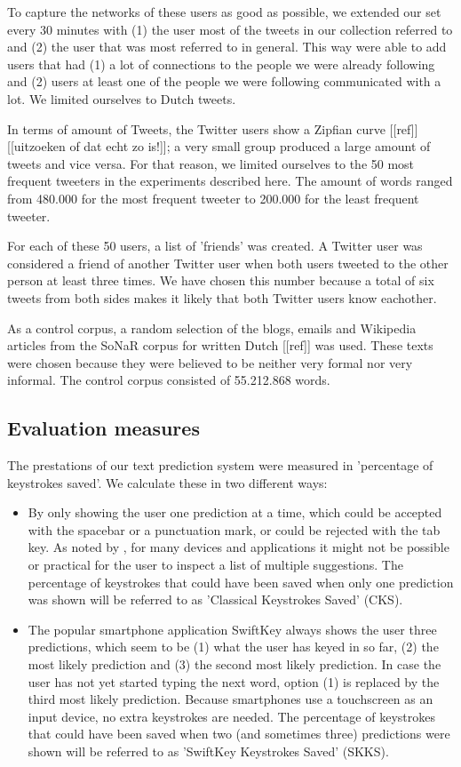 \documentclass[11pt]{article}
\begin{document}
To capture the networks of these users as good as possible, we extended our set every 30 minutes with (1) the user most of the tweets in our collection referred to and (2) the user that was most referred to in general. This way were able to add users that had (1) a lot of connections to the people we were already following and (2) users at least one of the people we were following communicated with a lot. We limited ourselves to Dutch tweets.

In terms of amount of Tweets, the Twitter users show a Zipfian curve [[ref]]  [[uitzoeken of dat echt zo is!]]; a very small group produced a large amount of tweets and vice versa. For that reason, we limited ourselves to the 50 most frequent tweeters in the experiments described here. The amount of words ranged from 480.000 for the most frequent tweeter to 200.000 for the least frequent tweeter.

For each of these 50 users, a list of 'friends' was created. A Twitter user was considered a friend of another Twitter user when both users tweeted to the other person at least three times. We have chosen this number because a total of six tweets from both sides makes it likely that both Twitter users know eachother. 

As a control corpus, a random selection of the blogs, emails and Wikipedia articles from the SoNaR corpus for written Dutch [[ref]] was used. These texts were chosen because they were believed to be neither very formal nor very informal. The control corpus consisted of 55.212.868 words.

\subsection{Evaluation measures}
The prestations of our text prediction system were measured in 'percentage of keystrokes saved'. We calculate these in two different ways:
\begin{itemize}
\item By only showing the user one prediction at a time, which could be accepted with the spacebar or a punctuation mark, or could be rejected with the tab key. As noted by , for many devices and applications it might not be possible or practical for the user to inspect a list of multiple suggestions. The percentage of keystrokes that could have been saved when only one prediction was shown will be referred to as 'Classical Keystrokes Saved' (CKS).
\item The popular smartphone application SwiftKey always shows the user three predictions, which seem to be (1) what the user has keyed in so far, (2) the most likely prediction and (3) the second most likely prediction. In case the user has not yet started typing the next word, option (1) is replaced by the third most likely prediction. Because smartphones use a touchscreen as an input device, no extra keystrokes are needed. The percentage of keystrokes that could have been saved when two (and sometimes three) predictions were shown will be referred to as 'SwiftKey Keystrokes Saved' (SKKS).
\end{itemize}
\end{document}
